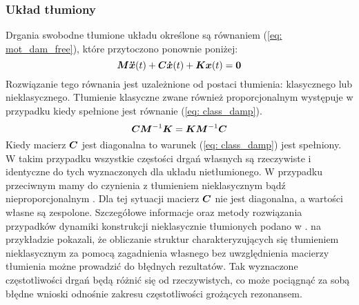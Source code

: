 \subsubsection{Układ tłumiony}
Drgania swobodne tłumione układu określone są równaniem (\ref{eq: mot_dam_free}), które przytoczono ponownie poniżej:
\begin{equation} \label{eq: mot_dam_free2}
\bm{M} \bm{\ddot{x}}(t) +\bm{C} \bm{\dot{x}}(t)+ \bm{Kx}(t) = \bm{0}
\end{equation}
Rozwiązanie tego równania jest uzależnione od postaci tłumienia: klasycznego lub nieklasycznego. Tłumienie klasyczne zwane również proporcjonalnym  występuje w przypadku kiedy spełnione jest równanie (\ref{eq: class_damp}). 
\begin{equation} \label{eq: class_damp}
\bm{CM}^{-1}\bm{K} = \bm{KM}^{-1}\bm{C}
\end{equation}
Kiedy macierz $\bm{C}$ jest diagonalna to warunek (\ref{eq: class_damp}) jest spełniony. W takim przypadku wszystkie częstości drgań własnych są rzeczywiste i identyczne do tych wyznaczonych dla układu nietłumionego. W przypadku przeciwnym mamy do czynienia z tłumieniem nieklasycznym bądź nieproporcjonalnym . Dla tej sytuacji macierz $\bm{C}$ nie jest diagonalna, a wartości własne są zespolone. Szczegółowe informacje oraz metody rozwiązania przypadków dynamiki konstrukcji nieklasycznie tłumionych podano w \parencite{Caughey1961,Chopra2012a}. \cite{Inman1995} na przykładzie pokazali, że obliczanie struktur charakteryzujących się tłumieniem nieklasycznym za pomocą zagadnienia własnego bez uwzględnienia macierzy tłumienia możne prowadzić do błędnych rezultatów. Tak wyznaczone częstotliwości drgań będą różnić się od rzeczywistych, co może pociągnąć za sobą błędne wnioski odnośnie zakresu częstotliwości grożących rezonansem.
